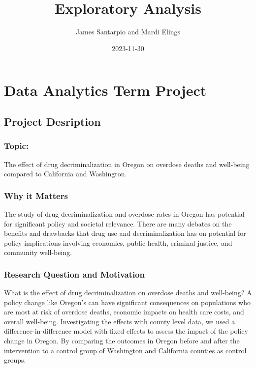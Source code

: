 \documentclass[
]{article}
\title{Exploratory Analysis}
\author{James Santarpio and Mardi Elings}
\date{2023-11-30}
\begin{document}
\maketitle

\hypertarget{data-analytics-term-project}{%
\section{Data Analytics Term
Project}\label{data-analytics-term-project}}

\hypertarget{project-desription}{%
\subsection{Project Desription}\label{project-desription}}

\hypertarget{topic}{%
\subsubsection{Topic:}\label{topic}}

The effect of drug decriminalization in Oregon on overdose deaths and
well-being compared to California and Washington.

\hypertarget{why-it-matters}{%
\subsubsection{Why it Matters}\label{why-it-matters}}

The study of drug decriminalization and overdose rates in Oregon has
potential for significant policy and societal relevance. There are many
debates on the benefits and drawbacks that drug use and
decriminalization has on potential for policy implications involving
economics, public health, criminal justice, and community well-being.

\hypertarget{research-question-and-motivation}{%
\subsubsection{Research Question and
Motivation}\label{research-question-and-motivation}}

What is the effect of drug decriminalization on overdose deaths and
well-being? A policy change like Oregon's can have significant
consequences on populations who are most at risk of overdose deaths,
economic impacts on health care costs, and overall well-being.
Investigating the effects with county level data, we used a
difference-in-difference model with fixed effects to assess the impact
of the policy change in Oregon. By comparing the outcomes in Oregon
before and after the intervention to a control group of Washington and
California counties as control groups.
\end{document}
